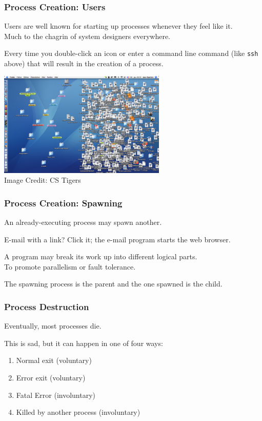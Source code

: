 \begin{frame}
\frametitle{Process Creation: Users}

Users are well known for starting up processes whenever they feel like it.\\
\quad Much to the chagrin of system designers everywhere. 

Every time you double-click an icon or enter a command line command (like \texttt{ssh} above) that will result in the creation of a process. 


\begin{center}
	\includegraphics[width=0.6\textwidth]{images/desktop-shortcut.jpg}\\
	Image Credit: CS Tigers
\end{center}

\end{frame}

\begin{frame}
\frametitle{Process Creation: Spawning}

An already-executing process may spawn another. 

E-mail with a link? Click it; the e-mail program starts the web browser.

A program may break its work up into different logical parts.\\
\quad To promote parallelism or fault tolerance. 

The spawning process is the \alert{parent} and the one spawned is the \alert{child}. 


\end{frame}

\begin{frame}
\frametitle{Process Destruction}

Eventually, most processes die. 

This is sad, but it can happen in one of four ways:
\begin{enumerate}
	\item Normal exit (voluntary) 
	\item Error exit (voluntary)
	\item Fatal Error (involuntary)
	\item Killed by another process (involuntary)
\end{enumerate}


\end{frame}

